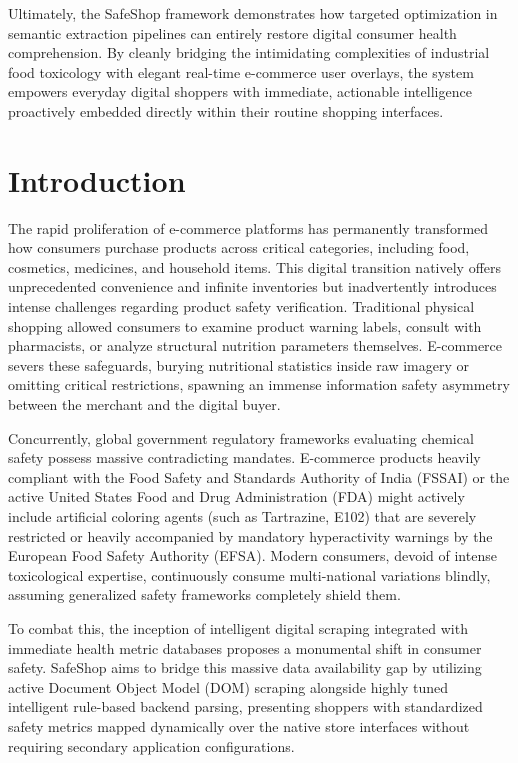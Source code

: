 \documentclass[12pt,a4paper]{report}
\begin{document}
Ultimately, the SafeShop framework demonstrates how targeted optimization in semantic extraction pipelines can entirely restore digital consumer health comprehension. By cleanly bridging the intimidating complexities of industrial food toxicology with elegant real-time e-commerce user overlays, the system empowers everyday digital shoppers with immediate, actionable intelligence proactively embedded directly within their routine shopping interfaces.

\newpage
\tableofcontents
\newpage
\listoffigures
\newpage
\listoftables
\newpage

\pagestyle{plain}
\setcounter{page}{1}

\chapter{Introduction}

The rapid proliferation of e-commerce platforms has permanently transformed how consumers purchase products across critical categories, including food, cosmetics, medicines, and household items. This digital transition natively offers unprecedented convenience and infinite inventories but inadvertently introduces intense challenges regarding product safety verification. Traditional physical shopping allowed consumers to examine product warning labels, consult with pharmacists, or analyze structural nutrition parameters themselves. E-commerce severs these safeguards, burying nutritional statistics inside raw imagery or omitting critical restrictions, spawning an immense information safety asymmetry between the merchant and the digital buyer. 

Concurrently, global government regulatory frameworks evaluating chemical safety possess massive contradicting mandates. E-commerce products heavily compliant with the Food Safety and Standards Authority of India (FSSAI) or the active United States Food and Drug Administration (FDA) might actively include artificial coloring agents (such as Tartrazine, E102) that are severely restricted or heavily accompanied by mandatory hyperactivity warnings by the European Food Safety Authority (EFSA). Modern consumers, devoid of intense toxicological expertise, continuously consume multi-national variations blindly, assuming generalized safety frameworks completely shield them.

To combat this, the inception of intelligent digital scraping integrated with immediate health metric databases proposes a monumental shift in consumer safety. SafeShop aims to bridge this massive data availability gap by utilizing active Document Object Model (DOM) scraping alongside highly tuned intelligent rule-based backend parsing, presenting shoppers with standardized safety metrics mapped dynamically over the native store interfaces without requiring secondary application configurations.
\end{document}
